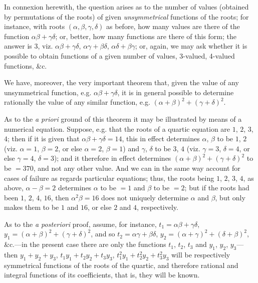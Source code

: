 \documentclass[12pt,a4paper]{article}
\theoremstyle{plain}
\theoremstyle{definition}
\theoremstyle{remark}
\begin{document}
In connexion herewith, the question arises as to the number of values (obtained by permutations of the roots) of given \textit{unsymmetrical} functions of the roots; for instance, with roots $(\alpha, \beta, \gamma, \delta)$ as before, how many values are there of the function $\alpha\beta + \gamma\delta$; or, better, how many functions are there of this form; the answer is 3, viz. $\alpha\beta + \gamma\delta$, $\alpha\gamma + \beta\delta$, $\alpha\delta + \beta\gamma$; or, again, we may ask whether it is possible to obtain functions of a given number of values, 3-valued, 4-valued functions, \&c.

We have, moreover, the very important theorem that, given the value of any unsymmetrical function, e.g. $\alpha\beta + \gamma\delta$, it is in general possible to determine rationally the value of any similar function, e.g. $(\alpha + \beta)^2 + (\gamma + \delta)^2$.

As to the \textit{a priori} ground of this theorem it may be illustrated by means of a numerical equation. Suppose, e.g. that the roots of a quartic equation are $1$, $2$, $3$, $4$; then if it is given that $\alpha\beta + \gamma\delta = 14$, this in effect determines $\alpha$, $\beta$ to be $1$, $2$ (viz. $\alpha = 1$, $\beta = 2$, or else $\alpha = 2$, $\beta = 1$) and $\gamma$, $\delta$ to be $3$, $4$ (viz. $\gamma = 3$, $\delta = 4$, or else $\gamma = 4$, $\delta = 3$); and it therefore in effect determines $(\alpha + \beta)^2 + (\gamma + \delta)^2$ to be $= 370$, and not any other value. And we can in the same way account for cases of failure as regards particular equations; thus, the roots being $1$, $2$, $3$, $4$, as above, $\alpha - \beta = 2$ determines $\alpha$ to be $= 1$ and $\beta$ to be $= 2$; but if the roots had been $1$, $2$, $4$, $16$, then $\alpha^2\beta = 16$ does not uniquely determine $\alpha$ and $\beta$, but only makes them to be $1$ and $16$, or else $2$ and $4$, respectively.

As to the \textit{a posteriori} proof, assume, for instance, $t_1 = \alpha\beta + \gamma\delta$, $y_1 = (\alpha + \beta)^2 + (\gamma + \delta)^2$, and so $t_2 = \alpha\gamma + \beta\delta$, $y_2 = (\alpha + \gamma)^2 + (\delta + \beta)^2$, \&c.---in the present case there are only the functions $t_1$, $t_2$, $t_3$ and $y_1$, $y_2$, $y_3$---then $y_1 + y_2 + y_3$, $t_1 y_1 + t_2 y_2 + t_3 y_3$, $t_1^2 y_1 + t_2^2 y_2 + t_3^2 y_3$ will be respectively symmetrical functions of the roots of the quartic, and therefore rational and integral functions of its coefficients, that is, they will be known.
\end{document}
